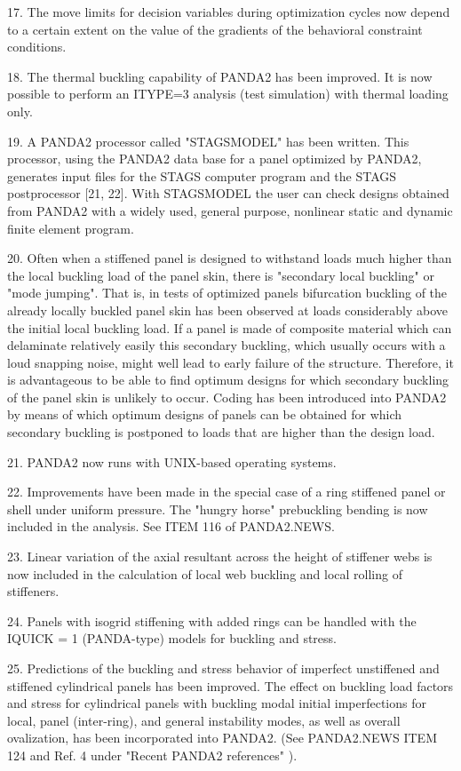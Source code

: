 17. The move limits for decision variables during optimization cycles now
depend to a certain extent on the value of the gradients of the behavioral
constraint conditions. 

18. The thermal buckling capability of PANDA2 has been improved. It is now
possible to perform an ITYPE=3 analysis (test simulation) with thermal
loading only. 

19. A PANDA2 processor called "STAGSMODEL" has been written.  This
processor, using the PANDA2 data base for a panel optimized by PANDA2,
generates input files for the STAGS computer program and the STAGS
postprocessor [21, 22].  With STAGSMODEL the user can check designs
obtained from PANDA2 with a widely used, general purpose, nonlinear static
and dynamic finite element program. 

20. Often when a stiffened panel is designed to withstand loads much
higher than the local buckling load of the panel skin, there is "secondary
local buckling" or "mode jumping".  That is, in tests of optimized panels
bifurcation buckling of the already locally buckled panel skin has been
observed at loads considerably above the initial local buckling load. If a
panel is made of composite material which can delaminate relatively easily
this secondary buckling, which usually occurs with a loud snapping noise,
might well lead to early failure of the structure.  Therefore, it is
advantageous to be able to find optimum designs for which secondary
buckling of the panel skin is unlikely to occur. Coding has been
introduced into PANDA2 by means of which optimum designs of panels can be
obtained for which secondary buckling is postponed to loads that are
higher than the design load. 

21. PANDA2 now runs with UNIX-based operating systems.

22. Improvements have been made in the special case of a ring stiffened
panel or shell under uniform pressure. The "hungry horse" prebuckling
bending is now included in the analysis. See ITEM 116 of PANDA2.NEWS. 

23. Linear variation of the axial resultant across the height of stiffener
webs is now included in the calculation of local web buckling and local
rolling of stiffeners. 

24. Panels with isogrid stiffening with added rings can be handled with
the IQUICK = 1 (PANDA-type) models for buckling and stress. 

25. Predictions of the buckling and stress behavior of imperfect
unstiffened and stiffened cylindrical panels has been improved. The effect
on buckling load factors and stress for cylindrical panels with buckling
modal initial imperfections for local, panel (inter-ring), and general
instability modes, as well as overall ovalization, has been incorporated
into PANDA2. (See PANDA2.NEWS ITEM 124 and Ref. 4 under "Recent PANDA2
references" ). 

